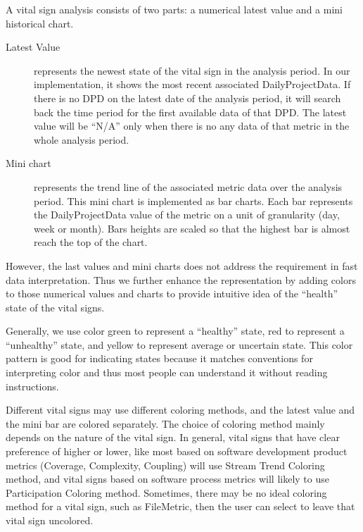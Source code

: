 A vital sign analysis consists of two parts: a numerical latest value and a mini historical chart. 
\begin{description}
\item[Latest Value] represents the newest state of the vital sign in the analysis period. In our implementation, it shows the most recent associated DailyProjectData. If there is no DPD on the latest date of the analysis period, it will search back the time period for the first available data of that DPD. The latest value will be ``N/A'' only when there is no any data of that metric in the whole analysis period.
\item[Mini chart] represents the trend line of the associated metric data over the analysis period. This mini chart is implemented as bar charts. Each bar represents the DailyProjectData value of the metric on a unit of granularity (day, week or month). Bars heights are scaled so that the highest bar is almost reach the top of the chart.
\end{description}

However, the last values and mini charts does not address the requirement in fast data interpretation. Thus we further enhance the representation by adding colors to those numerical values and charts to provide intuitive idea of the ``health'' state of the vital signs.

Generally, we use color green to represent a ``healthy'' state, red to represent a ``unhealthy'' state, and yellow to represent average or uncertain state. This color pattern is good for indicating states because it matches conventions for interpreting color and thus most people can understand it without reading instructions.

Different vital signs may use different coloring methods, and the latest value and the mini bar are colored separately. The choice of coloring method mainly depends on the nature of the vital sign. In general, vital signs that have clear preference of higher or lower, like most based on software development product metrics (Coverage, Complexity, Coupling) will use Stream Trend Coloring method, and vital signs based on software process metrics will likely to use Participation Coloring method. Sometimes, there may be no ideal coloring method for a vital sign, such as FileMetric, then the user can select to leave that vital sign uncolored.

